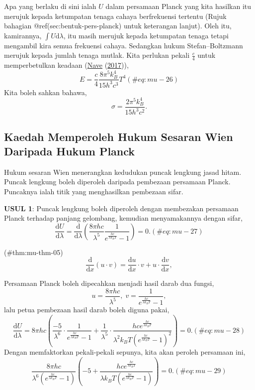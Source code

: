\documentclass[
]{book}
\begin{document}
Apa yang berlaku di sini ialah \(U\) dalam persamaan Planck yang kita
hasilkan itu merujuk kepada ketumpatan tenaga cahaya berfrekuensi
tertentu (Rujuk bahagian @ref(sec:bentuk-pers-planck) untuk keterangan
lanjut). Oleh itu, kamirannya, \(\int U \text{d}\lambda\), itu masih
merujuk kepada ketumpatan tenaga tetapi mengambil kira semua frekuensi
cahaya. Sedangkan hukum Stefan--Boltzmann merujuk kepada jumlah tenaga
mutlak. Kita perlukan pekali \(\frac{c}{4}\) untuk memperbetulkan
keadaan (\protect\hyperlink{ref-Nave2017}{Nave}
(\protect\hyperlink{ref-Nave2017}{2017})), \begin{equation}
E = \frac{c}{4}\frac{8\pi^5 k_B^4}{15h^3c^3}T^4
(\#eq:mu-26)
\end{equation} Kita boleh sahkan bahawa,
\[\sigma =  \frac{2\pi^5 k_B^4}{15h^3c^2}.\]

\hypertarget{sec:planck-sesaran-wien}{%
\subsection{Kaedah Memperoleh Hukum Sesaran Wien Daripada Hukum
Planck}\label{sec:planck-sesaran-wien}}

Hukum sesaran Wien menerangkan kedudukan puncak lengkung jasad hitam.
Puncak lengkung boleh diperoleh daripada pembezaan persamaan Planck.
Puncaknya ialah titik yang menghasilkan pembezaan sifar.

\textbf{USUL 1}: Puncak lengkung boleh diperoleh dengan membezakan
persamaan Planck terhadap panjang gelombang, kemudian menyamakannya
dengan sifar, \begin{equation}
\frac{\text{d}U}{\text{d}\lambda} = \frac{\text{d}}{\text{d}\lambda}\left(\frac{8\pi hc}{\lambda^5}\frac{1}{e^{\frac{hc}{\lambda k_BT}}-1}\right) = 0.(\#eq:mu-27)
\end{equation}

\BeginKnitrBlock{theorem}{}

\protect\hypertarget{thm:mu-thm-05}{}{(\#thm:mu-thm-05) {}
}\[\frac{\text{d}}{\text{d}x}(u\cdot v) = \frac{\text{d}u}{\text{d}x}\cdot v + u\cdot\frac{\text{d}v}{\text{d}x},\]

Persamaan Planck boleh dipecahkan menjadi hasil darab dua fungsi,
\[u = \frac{8\pi hc}{\lambda^5},\; v = \frac{1}{e^{\frac{hc}{\lambda k_BT}}-1},\]
lalu petua pembezaan hasil darab boleh diguna pakai, \begin{equation}
\frac{\text{d}U}{\text{d}\lambda} = 8\pi hc\left(\frac{-5}{\lambda^6}\cdot\frac{1}{e^{\frac{hc}{\lambda k_BT}}-1}+ \frac{1}{\lambda^5}\cdot\frac{hce^{\frac{hc}{\lambda k_BT}}}{\lambda^2 k_BT\left(e^{\frac{hc}{\lambda k_BT}}-1\right)^2}\right) = 0.
(\#eq:mu-28)
\end{equation} Dengan memfaktorkan pekali-pekali sepunya, kita akan
peroleh persamaan ini, \begin{equation}
\frac{8\pi hc}{\lambda^6\left(e^{\frac{hc}{\lambda k_BT}}-1\right)}\left(-5+\frac{hce^{\frac{hc}{\lambda k_BT}}}{\lambda k_BT\left(e^{\frac{hc}{\lambda k_BT}}-1\right)}\right) = 0.
(\#eq:mu-29)
\end{equation}
\end{document}
